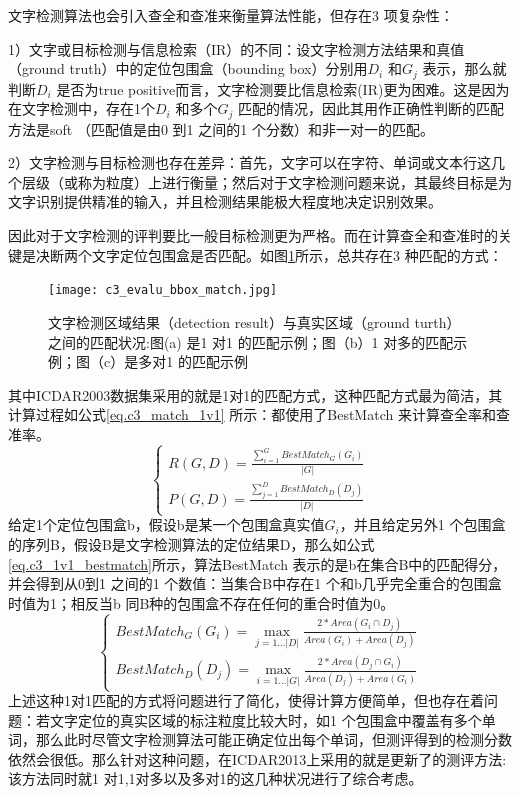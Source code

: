         文字检测算法也会引入查全和查准来衡量算法性能，但存在3 项复杂性：

        1）文字或目标检测与信息检索（IR）的不同：设文字检测方法结果和真值（ground truth）中的定位包围盒（bounding box）分别用$D_i$ 和$G_j$ 表示，那么就判断$D_i$ 是否为true positive而言，文字检测要比信息检索(IR)更为困难。这是因为在文字检测中，存在1个$D_i$ 和多个$G_j$ 匹配的情况，因此其用作正确性判断的匹配方法是soft （匹配值是由0 到1 之间的1 个分数）和非一对一的匹配。

        2）文字检测与目标检测也存在差异：首先，文字可以在字符、单词或文本行这几个层级（或称为粒度）上进行衡量；然后对于文字检测问题来说，其最终目标是为文字识别提供精准的输入，并且检测结果能极大程度地决定识别效果。

        因此对于文字检测的评判要比一般目标检测更为严格。而在计算查全和查准时的关键是决断两个文字定位包围盒是否匹配。如图\ref{fig.c3_evalu_bbox_match}所示，总共存在3 种匹配的方式：

        \begin{figure}[!h]
        \centering
        \texttt{[image: c3\_evalu\_bbox\_match.jpg]} \caption{文字检测区域结果（detection result）与真实区域（ground turth）之间的匹配状况:图(a) 是1 对1 的匹配示例；图（b）1 对多的匹配示例；图（c）是多对1 的匹配示例}
        \label{fig.c3_evalu_bbox_match}
        \end{figure}

        其中ICDAR2003数据集采用的就是1对1的匹配方式\cite{Mariano2002Performance}，这种匹配方式最为简洁，其计算过程如公式\ref{eq.c3_match_1v1} 所示：都使用了BestMatch 来计算查全率和查准率。
        \begin{equation}
        \left\{
        \begin{array}{c}
        R(G,D)=\frac{\sum_{i=1}^GBestMatch_G(G_i)}{|G|}\\
        P(G,D)=\frac{\sum_{j=1}^DBestMatch_D(D_j)}{|D|}
        \end{array}
        \right.
        \label{eq.c3_match_1v1}
        \end{equation}
        给定1个定位包围盒b，假设b是某一个包围盒真实值$G_i$，并且给定另外1 个包围盒的序列B，假设B是文字检测算法的定位结果D，那么如公式\ref{eq.c3_1v1_bestmatch}所示，算法BestMatch 表示的是b在集合B中的匹配得分，并会得到从0到1 之间的1 个数值：当集合B中存在1 个和b几乎完全重合的包围盒时值为1；相反当b 同B种的包围盒不存在任何的重合时值为0。
        \begin{equation}
        \left\{
        \begin{array}{c}
        BestMatch_G(G_i)=\max_{j=1...|D|} \frac{2*Area(G_i \cap D_j)}{Area(G_i)+Area(D_j)}\\
        BestMatch_D(D_j)=\max_{i=1...|G|} \frac{2*Area(D_j \cap G_i)}{Area(D_j)+Area(G_i)}
        \end{array}
        \right.
        \label{eq.c3_1v1_bestmatch}
        \end{equation}
        上述这种1对1匹配的方式将问题进行了简化，使得计算方便简单，但也存在着问题：若文字定位的真实区域的标注粒度比较大时，如1 个包围盒中覆盖有多个单词，那么此时尽管文字检测算法可能正确定位出每个单词，但测评得到的检测分数依然会很低。那么针对这种问题，在ICDAR2013上采用的就是更新了的测评方法\cite{Wolf2006Object}:该方法同时就1 对1,1对多以及多对1的这几种状况进行了综合考虑。

